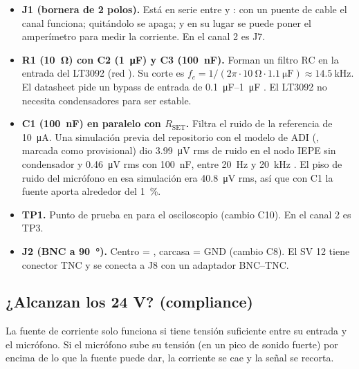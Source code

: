\begin{itemize}
  \item \textbf{J1 (bornera de 2 polos).} Está en serie entre  y : con un puente de cable
        el canal funciona; quitándolo se apaga; y en su lugar se puede poner el amperímetro para medir la corriente.
        En el canal 2 es J7.
  \item \textbf{R1 (\SI{10}{\ohm}) con C2 (\SI{1}{\micro\farad}) y C3 (\SI{100}{\nano\farad}).} Forman un filtro RC en
        la entrada del LT3092 (red ). Su corte es
        $f_c = 1/(2\pi\cdot\SI{10}{\ohm}\cdot\SI{1.1}{\micro\farad}) \approx \SI{14.5}{\kilo\hertz}$. El datasheet pide
        un bypass de entrada de \SIrange{0.1}{1}{\micro\farad} \copia[REGLAS.md §3]. El LT3092 no necesita
        condensadores para ser estable.
  \item \textbf{C1 (\SI{100}{\nano\farad}) en paralelo con $R_{\mathrm{SET}}$.} Filtra el ruido de la referencia de
        \SI{10}{\micro\ampere}. Una simulación previa del repositorio con el modelo de ADI
        (, marcada como provisional) dio \SI{3.99}{\micro\volt} rms de ruido en el
        nodo IEPE sin condensador y \SI{0.46}{\micro\volt} rms con \SI{100}{\nano\farad}, entre \SI{20}{\hertz} y
        \SI{20}{\kilo\hertz} \estimado. El piso de ruido del micrófono en esa simulación era
        \SI{40.8}{\micro\volt} rms, así que con C1 la fuente aporta alrededor del \SI{1}{\percent}.
  \item \textbf{TP1.} Punto de prueba en  para el osciloscopio (cambio C10). En el canal 2 es TP3.
  \item \textbf{J2 (BNC a \SI{90}{\degree}).} Centro = , carcasa = GND (cambio C8). El SV 12 tiene conector
        TNC y se conecta a J8 con un adaptador BNC–TNC.
\end{itemize}

\subsection{¿Alcanzan los 24 V? (compliance)}

La fuente de corriente solo funciona si tiene tensión suficiente entre su entrada y el micrófono. Si el micrófono
sube su tensión (en un pico de sonido fuerte) por encima de lo que la fuente puede dar, la corriente se cae y la señal
se recorta.


